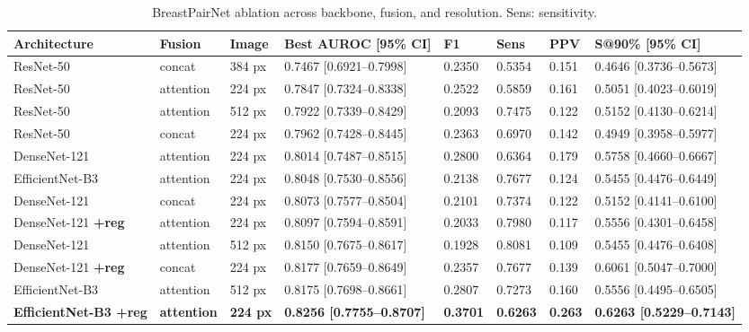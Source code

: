 \documentclass[conference]{IEEEtran}
\begin{document}
\begin{table}[!t]
\centering
\caption{BreastPairNet ablation across backbone, fusion, and resolution. Sens: sensitivity.}
\label{tab:breastpairnet}
\begin{tabular}{|p{}|p{}|p{}|p{}|p{}|p{}|p{}|p{}|}
\hline
\textbf{Architecture} & \textbf{Fusion} & \textbf{Image} & \textbf{Best AUROC [95\% CI]} & \textbf{F1} & \textbf{Sens} & \textbf{PPV} & \textbf{S@90\% [95\% CI]} \\
\hline
ResNet-50 & concat & 384 px & 0.7467 [0.6921--0.7998] & 0.2350 & 0.5354 & 0.151 & 0.4646 [0.3736--0.5673] \\
\hline
ResNet-50 & attention & 224 px & 0.7847 [0.7324--0.8338] & 0.2522 & 0.5859 & 0.161 & 0.5051 [0.4023--0.6019] \\
\hline
ResNet-50 & attention & 512 px & 0.7922 [0.7339--0.8429] & 0.2093 & 0.7475 & 0.122 & 0.5152 [0.4130--0.6214] \\
\hline
ResNet-50 & concat & 224 px & 0.7962 [0.7428--0.8445] & 0.2363 & 0.6970 & 0.142 & 0.4949 [0.3958--0.5977] \\
\hline
DenseNet-121 & attention & 224 px & 0.8014 [0.7487--0.8515] & 0.2800 & 0.6364 & 0.179 & 0.5758 [0.4660--0.6667] \\
\hline
EfficientNet-B3 & attention & 224 px & 0.8048 [0.7530--0.8556] & 0.2138 & 0.7677 & 0.124 & 0.5455 [0.4476--0.6449] \\
\hline
DenseNet-121 & concat & 224 px & 0.8073 [0.7577--0.8504] & 0.2101 & 0.7374 & 0.122 & 0.5152 [0.4141--0.6100] \\
\hline
DenseNet-121 \textbf{+reg} & attention & 224 px & 0.8097 [0.7594--0.8591] & 0.2033 & 0.7980 & 0.117 & 0.5556 [0.4301--0.6458] \\
\hline
DenseNet-121 & attention & 512 px & 0.8150 [0.7675--0.8617] & 0.1928 & 0.8081 & 0.109 & 0.5455 [0.4476--0.6408] \\
\hline
DenseNet-121 \textbf{+reg} & concat & 224 px & 0.8177 [0.7659--0.8649] & 0.2357 & 0.7677 & 0.139 & 0.6061 [0.5047--0.7000] \\
\hline
EfficientNet-B3 & attention & 512 px & 0.8175 [0.7698--0.8661] & 0.2807 & 0.7273 & 0.160 & 0.5556 [0.4495--0.6505] \\
\hline
\textbf{EfficientNet-B3 +reg} & \textbf{attention} & \textbf{224 px} & \textbf{0.8256 [0.7755--0.8707]} & \textbf{0.3701} & \textbf{0.6263} & \textbf{0.263} & \textbf{0.6263 [0.5229--0.7143]} \\
\hline

\end{tabular}
\par\vspace{3pt}{\raggedright\footnotesize PPV = TP/(TP+FP) at the Youden-optimal threshold. At 4.95\% prevalence, PPV is inherently low; higher PPV reflects a more conservative threshold (lower sensitivity). All CIs via 2,000-resample percentile bootstrap on the 2,000-pair test split.\par}
\end{table}
\end{document}
